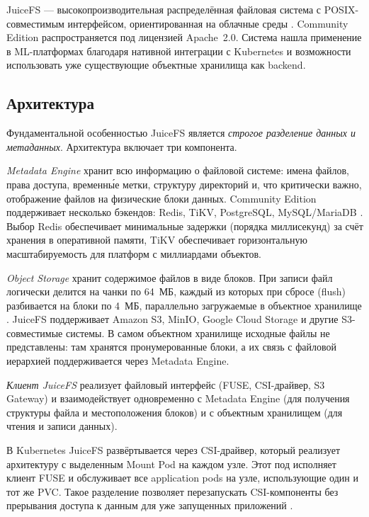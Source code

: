 JuiceFS --- высокопроизводительная распределённая файловая система с POSIX-совместимым интерфейсом, ориентированная на облачные среды \cite{juicefs_intro}. Community Edition распространяется под лицензией Apache~2.0. Система нашла применение в ML-платформах благодаря нативной интеграции с Kubernetes и возможности использовать уже существующие объектные хранилища как backend.

\subsection*{Архитектура}

Фундаментальной особенностью JuiceFS является \textit{строгое разделение данных и метаданных}. Архитектура включает три компонента.

\textit{Metadata Engine} хранит всю информацию о файловой системе: имена файлов, права доступа, временны́е метки, структуру директорий и, что критически важно, отображение файлов на физические блоки данных. Community Edition поддерживает несколько бэкендов: Redis, TiKV, PostgreSQL, MySQL/MariaDB \cite{juicefs_design}. Выбор Redis обеспечивает минимальные задержки (порядка миллисекунд) за счёт хранения в оперативной памяти, TiKV обеспечивает горизонтальную масштабируемость для платформ с миллиардами объектов.

\textit{Object Storage} хранит содержимое файлов в виде блоков. При записи файл логически делится на чанки по 64~МБ, каждый из которых при сбросе (flush) разбивается на блоки по 4~МБ, параллельно загружаемые в объектное хранилище \cite{juicefs_design}. JuiceFS поддерживает Amazon S3, MinIO, Google Cloud Storage и другие S3-совместимые системы. В самом объектном хранилище исходные файлы не представлены: там хранятся пронумерованные блоки, а их связь с файловой иерархией поддерживается через Metadata Engine.

\textit{Клиент JuiceFS} реализует файловый интерфейс (FUSE, CSI-драйвер, S3 Gateway) и взаимодействует одновременно с Metadata Engine (для получения структуры файла и местоположения блоков) и с объектным хранилищем (для чтения и записи данных).

В Kubernetes JuiceFS развёртывается через CSI-драйвер, который реализует архитектуру с выделенным Mount Pod на каждом узле. Этот под исполняет клиент FUSE и обслуживает все application pods на узле, использующие один и тот же PVC. Такое разделение позволяет перезапускать CSI-компоненты без прерывания доступа к данным для уже запущенных приложений \cite{juicefs_perf}.

